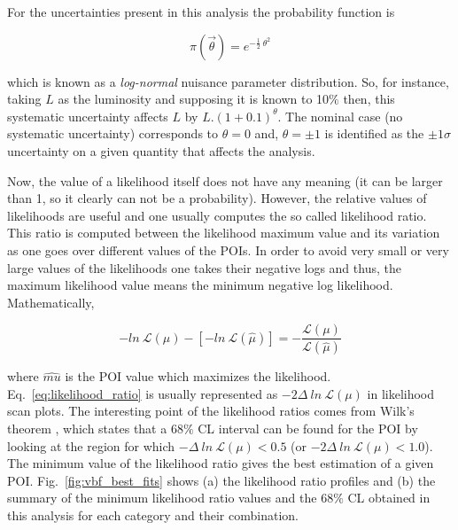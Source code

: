 For the uncertainties present in this analysis the probability function is

\begin{equation}
\pi(\vec{\theta}) = e^{-\frac{1}{2}~\theta^{2}}
\end{equation}

which is known as a \textit{log-normal} nuisance parameter distribution. So, for instance, taking $L$ as the luminosity and supposing it is known to 10$\%$ then, this systematic uncertainty affects $L$ by $L.(1 + 0.1)^{\theta}$. The nominal case (no systematic uncertainty) corresponds to $\theta = 0$ and, $\theta = \pm1$ is identified as the $\pm1 \sigma$ uncertainty on a given quantity that affects the analysis.

Now, the value of a likelihood itself does not have any meaning (it can be larger than 1, so it clearly can not be a probability). However, the relative values of likelihoods are useful and one usually computes the so called likelihood ratio. This ratio is computed between the likelihood maximum value and its variation as one goes over different values of the POIs. In order to avoid very small or very large values of the likelihoods one takes their negative logs and thus, the maximum likelihood value means the minimum negative log likelihood. Mathematically,

\begin{equation}
\label{eq:likelihood_ratio}
-ln~\mathcal{L}(\mu) - [-ln~\mathcal{L}(\hat{\mu})] = -\frac{\mathcal{L}(\mu)}{\mathcal{L}(\hat{\mu})}
\end{equation}

where $\hat{mu}$ is the POI value which maximizes the likelihood. Eq.~\ref{eq:likelihood_ratio} is usually represented as $-2\Delta~ln~\mathcal{L}(\mu)$ in likelihood scan plots. The interesting point of the likelihood ratios comes from Wilk's theorem \cite{bib:MIT-650,bib:UCBerkeley-26-2018}, which states that a 68$\%$ CL interval can be found for the POI by looking at the region for which $-\Delta~ln~\mathcal{L}(\mu) < 0.5$ (or $-2\Delta~ln~\mathcal{L}(\mu) < 1.0$). The minimum value of the likelihood ratio gives the best estimation of a given POI. Fig.~\ref{fig:vbf_best_fits} shows (a) the likelihood ratio profiles and (b) the summary of the minimum likelihood ratio values and the $68\%$ CL obtained in this analysis for each category and their combination.


